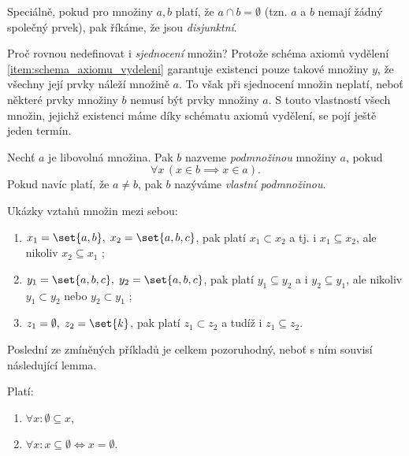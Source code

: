 \begin{remark}
    Speciálně, pokud pro množiny $a,b$ platí, že $a\cap b=\emptyset$ (tzn. $a$ a $b$ nemají žádný společný prvek), pak říkáme, že jsou \emph{disjunktní}.
\end{remark}
Proč rovnou nedefinovat i \emph{sjednocení} množin? Protože schéma axiomů vydělení \ref{item:schema_axiomu_vydeleni} garantuje existenci pouze takové množiny $y$, že všechny její prvky náleží množině $a$. To však při sjednocení množin neplatí, neboť některé prvky množiny $b$ nemusí být prvky množiny $a$. S touto vlastností všech množin, jejichž existenci máme díky schématu axiomů vydělení, se pojí ještě jeden termín.
\begin{definition}\label{def:podmnozina}
    Nechť $a$ je libovolná množina. Pak $b$ nazveme \emph{podmnožinou} množiny $a$, pokud
    \begin{equation*}
        \forall x\,(x\in b \implies x\in a).
    \end{equation*}
    Pokud navíc platí, že $a\neq b$, pak $b$ nazýváme \emph{vlastní podmnožinou}.
\end{definition}
\begin{example}
    Ukázky vztahů množin mezi sebou:
    \begin{enumerate}[label=(\roman*)]
        \item $x_1=\set{a,b},\; x_2=\set{a,b,c}$, pak platí $x_1 \subset x_2$ a tj. i $x_1 \subseteq x_2$, ale nikoliv $x_2 \subseteq x_1$ ;
        \item $y_1=\set{a,b,c},\; y_2=\set{a,b,c}$, pak platí $y_1 \subseteq y_2$ a i $y_2 \subseteq y_1$, ale nikoliv $y_1 \subset y_2$ nebo $y_2 \subset y_1$ ;
        \item $z_1=\emptyset,\; z_2=\set{k}$, pak platí $z_1 \subset z_2$ a tudíž i $z_1 \subseteq z_2$.
    \end{enumerate}
\end{example}
Poslední ze zmíněných příkladů je celkem pozoruhodný, neboť s ním souvisí následující lemma.
\begin{lemma}\label{lem:o_prazdne_mnozine}
    Platí:
    \begin{enumerate}[label=(\roman*)]
        \item $\forall x: \emptyset\subseteq x$,
        \item $\forall x: x\subseteq\emptyset\iff x=\emptyset$.
    \end{enumerate}
\end{lemma}

